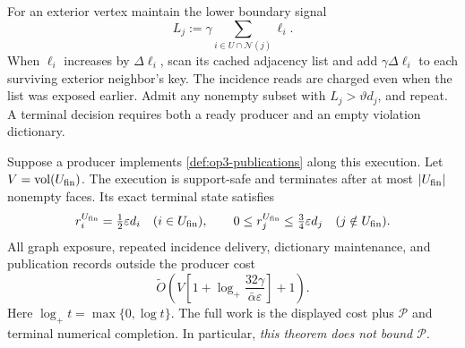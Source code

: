 For an exterior vertex maintain the lower boundary signal
\begin{equation}
 L_j:=\gamma\sum_{i\in U\cap\mathcal N(j)}\ell_i.
 \label{eq:op3-lower-signal}
\end{equation}
When $\ell_i$ increases by $\Delta\ell_i$, scan its cached adjacency list
and add $\gamma\Delta\ell_i$ to each surviving exterior neighbor's key.
The incidence reads are charged even when the list was exposed earlier.
Admit any nonempty subset with $L_j>\vartheta d_j$, and repeat. A terminal
decision requires both a ready producer and an empty violation dictionary.

\begin{theorem}
\label{thm:op3-geometric-recipient}
Suppose a producer implements \cref{def:op3-publications} along this
execution. Let $V=\operatorname{vol}(U_{\rm fin})$. The execution is support-safe and
terminates after at most $|U_{\rm fin}|$ nonempty faces. Its exact terminal
state satisfies
\begin{equation}
 r_i^{U_{\rm fin}}=\tfrac12\varepsilon d_i\quad(i\in U_{\rm fin}),
 \qquad
 0\leq r_j^{U_{\rm fin}}\leq\tfrac34\varepsilon d_j
       \quad(j\notin U_{\rm fin}).
 \label{eq:op3-quiet-certificate}
\end{equation}
All graph exposure, repeated incidence delivery, dictionary maintenance,
and publication records outside the producer cost
\begin{equation}
 \widetilde O\!\left(
  V\left[1+\log_+\frac{32\gamma}{\bar\alpha\varepsilon}\right]+1
 \right).
 \label{eq:op3-recipient-work}
\end{equation}
Here $\log_+ t=\max\{0,\log t\}$. The full work is the displayed cost
plus $\mathcal P$ and terminal numerical completion. In particular,
\emph{this theorem does not bound $\mathcal P$}.
\end{theorem}
